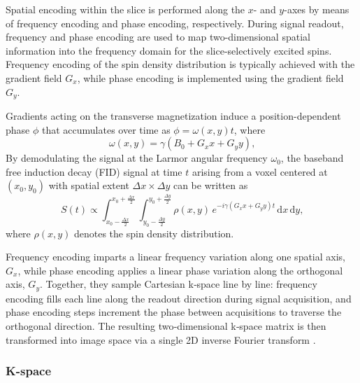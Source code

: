 Spatial encoding within the slice is performed along the $x$- and $y$-axes by means of frequency encoding and phase encoding, respectively. During signal readout, frequency and phase encoding are used to map two-dimensional spatial information into the frequency domain for the slice-selectively excited spins. Frequency encoding of the spin density distribution is typically achieved with the gradient field $G_x$, while phase encoding is implemented using the gradient field $G_y$. 

Gradients acting on the transverse magnetization induce a position-dependent phase $\phi$ that accumulates over time as $\phi = \omega(x,y)t$, where
\begin{equation}
    \omega(x,y) = \gamma \left(B_0 + G_x x + G_y y\right)\text{,}
\end{equation}
By demodulating the signal at the Larmor angular frequency $\omega_0$, the baseband free induction decay (FID) signal at time $t$ arising from a voxel centered at $(x_0, y_0)$ with spatial extent $\Delta x \times \Delta y$ can be written as
\begin{equation}
    S(t) \propto \int_{x_0-\frac{\Delta x}{2}}^{x_0+\frac{\Delta x}{2}} \int_{y_0-\frac{\Delta y}{2}}^{y_0+\frac{\Delta y}{2}} \rho(x,y) \, e^{-i\gamma\left(G_x x + G_y y\right)t} \, \text{d}x \,\text{d}y\text{,}
    \label{eq:FDI}
\end{equation}
where $\rho(x,y)$ denotes the spin density distribution. 

Frequency encoding imparts a linear frequency variation along one spatial axis, $G_x$, while phase encoding applies a linear phase variation along the orthogonal axis, $G_y$. Together, they sample Cartesian k‑space line by line: frequency encoding fills each line along the readout direction during signal acquisition, and phase encoding steps increment the phase between acquisitions to traverse the orthogonal direction. The resulting two‑dimensional k‑space matrix is then transformed into image space via a single 2D inverse Fourier transform .


\subsubsection{K-space}
\label{subsec:kspace}

